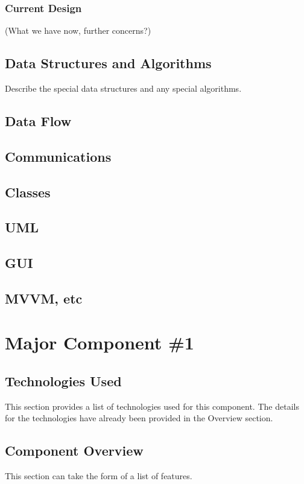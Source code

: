 \subsubsection{Current Design}
(What we have now, further concerns?)
 
 \subsection{Data Structures and Algorithms}
 Describe the special data structures and any special algorithms.
 
 \subsection{Data Flow}
 
 \subsection{Communications}
 
 \subsection{Classes}
 
 \subsection{UML}
 
 \subsection{GUI}
 
 \subsection{MVVM, etc}

\section{Major Component \#1 }

\subsection{Technologies  Used}
This section provides a list of technologies used for this component.  The details 
for the technologies have already been provided in the Overview section. 

\subsection{Component  Overview}
This section can take the form of a list of features. 

